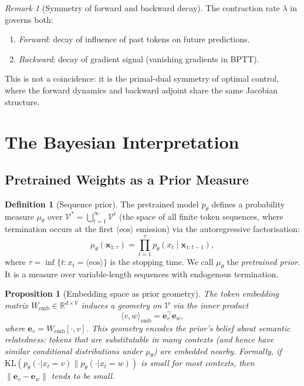 \documentclass[11pt,a4paper]{article}
\theoremstyle{plain}
\newtheorem{proposition}[theorem]{Proposition}
\theoremstyle{definition}
\newtheorem{definition}[theorem]{Definition}
\theoremstyle{remark}
\newtheorem{remark}[theorem]{Remark}
\newcommand{\R}{\mathbb{R}}
\newcommand{\KL}{\mathrm{KL}}
\newcommand{\vocab}{\mathcal{V}}
\begin{document}
\begin{remark}[Symmetry of forward and backward decay]
The contraction rate $\lambda$ in  governs both:
\begin{enumerate}[label=(\alph*),nosep]
  \item \emph{Forward}: decay of influence of past tokens on future predictions.
  \item \emph{Backward}: decay of gradient signal (vanishing gradients in BPTT).
\end{enumerate}
This is not a coincidence: it is the primal-dual symmetry of optimal control,
where the forward dynamics and backward adjoint share the same Jacobian
structure.
\end{remark}


\section{The Bayesian Interpretation}\label{sec:bayes}

\subsection{Pretrained Weights as a Prior Measure}

\begin{definition}[Sequence prior]
The pretrained model $p_\theta$ defines a probability measure $\mu_\theta$ over
$\vocab^* = \bigcup_{t=1}^{\infty} \vocab^t$ (the space of all finite token
sequences, where termination occurs at the first
$\langle\mathrm{eos}\rangle$ emission) via the autoregressive factorisation:
\begin{equation}\label{eq:prior}
  \mu_\theta(\bm{x}_{1:\tau})
  = \prod_{t=1}^{\tau} p_\theta(x_t \mid \bm{x}_{1:t-1}),
\end{equation}
where $\tau = \inf\{t : x_t = \langle\mathrm{eos}\rangle\}$ is the stopping
time. We call $\mu_\theta$ the \emph{pretrained prior}. It is a measure over
variable-length sequences with endogenous termination.
\end{definition}

\begin{proposition}[Embedding space as prior geometry]\label{prop:prior_geom}
The token embedding matrix $W_{\mathrm{emb}} \in \R^{d \times V}$ induces a
geometry on $\vocab$ via the inner product
\[
  \langle v, w \rangle_{\mathrm{emb}} = \bm{e}_v^\top \bm{e}_w,
\]
where $\bm{e}_v = W_{\mathrm{emb}}[\cdot, v]$. This geometry encodes the
prior's belief about semantic relatedness: tokens that are substitutable
in many contexts (and hence have similar conditional distributions under
$\mu_\theta$) are embedded nearby. Formally, if
$\KL(p_\theta(\cdot | x_t = v) \| p_\theta(\cdot | x_t = w))$ is small for
most contexts, then $\|\bm{e}_v - \bm{e}_w\|$ tends to be small.
\end{proposition}
\end{document}
